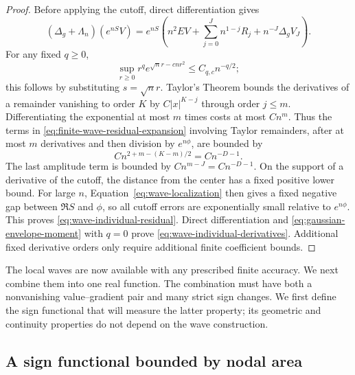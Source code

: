 \begin{proof}
Before applying the cutoff, direct differentiation gives
\begin{equation}
 (\Delta_g+\Lambda_n)(e^{nS}V)
 =e^{nS}\left(n^2EV+
       \sum_{j=0}^J n^{1-j}R_j+n^{-J}\Delta_gV_J\right).
 \label{eq:finite-wave-residual-expansion}
\end{equation}
For any fixed $q\ge0$,
\begin{equation}
 \sup_{r\ge0} r^q e^{\sqrt n r-cn r^2}
       \le C_{q,c}n^{-q/2};
 \label{eq:gaussian-envelope-moment}
\end{equation}
this follows by substituting $s=\sqrt n r$.  Taylor's Theorem bounds
the derivatives of a remainder vanishing to order $K$ by
$C|x|^{K-j}$ through order $j\le m$.  Differentiating the exponential
at most $m$ times costs at most $Cn^m$.  Thus the terms in
\eqref{eq:finite-wave-residual-expansion} involving Taylor
remainders, after at most $m$ derivatives and then division by
$e^{n\phi}$, are bounded by
\[
 C n^{2+m-(K-m)/2}=C n^{-D-1}.
\]
The last amplitude term is bounded by $Cn^{m-J}=Cn^{-D-1}$.
On the support of a derivative of the cutoff, the distance from the
center has a fixed positive lower bound.  For large $n$,
Equation~\eqref{eq:wave-localization} then gives a fixed negative gap
between $\Re S$ and $\phi$, so all cutoff errors are exponentially
small relative to $e^{n\phi}$.  This proves
\eqref{eq:wave-individual-residual}.  Direct differentiation
and \eqref{eq:gaussian-envelope-moment} with $q=0$ prove
\eqref{eq:wave-individual-derivatives}.  Additional fixed
derivative orders only require additional finite coefficient bounds.
\end{proof}

The local waves are now available with any prescribed finite accuracy.
We next combine them into one real function.  The combination must have
both a nonvanishing value--gradient pair and many strict sign changes.
We first define the sign functional that will measure the latter property;
its geometric and continuity properties do not depend on the wave
construction.

\subsection{A sign functional bounded by nodal area}

